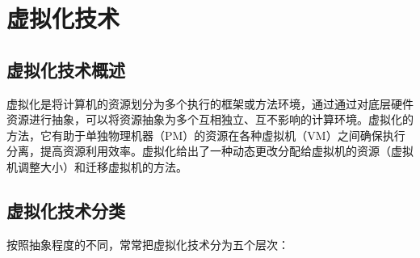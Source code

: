 \section{虚拟化技术}

\subsection{虚拟化技术概述}
虚拟化是将计算机的资源划分为多个执行的框架或方法环境，通过通过对底层硬件资源进行抽象，可以将资源抽象为多个互相独立、互不影响的计算环境。虚拟化的方法，它有助于单独物理机器（PM）的资源在各种虚拟机（VM）之间确保执行分离，提高资源利用效率。虚拟化给出了一种动态更改分配给虚拟机的资源（虚拟机调整大小）和迁移虚拟机的方法\cite{Nivedita}。

\subsection{虚拟化技术分类}
按照抽象程度的不同，常常把虚拟化技术分为五个层次：
